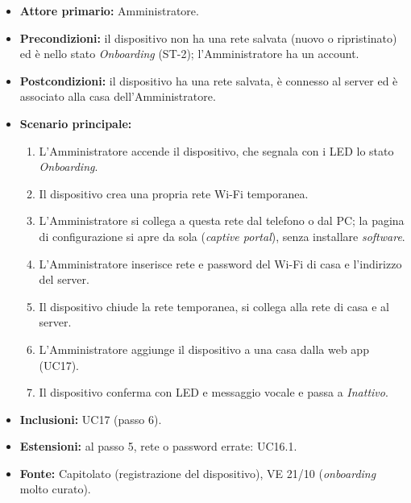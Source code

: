 \documentclass[12pt,a4paper]{article}
\newcommand{\tightlist}{\setlength{\itemsep}{1pt}\setlength{\parskip}{0pt}}
\begin{document}
\begin{itemize}

\tightlist

\item \textbf{Attore primario:} Amministratore.

\item \textbf{Precondizioni:} il dispositivo non ha una rete salvata (nuovo o ripristinato) ed è nello stato \emph{Onboarding} (ST-2); l'Amministratore ha un account.

\item \textbf{Postcondizioni:} il dispositivo ha una rete salvata, è connesso al server ed è associato alla casa dell'Amministratore.

\item \textbf{Scenario principale:}

\begin{enumerate}

\tightlist

\item L'Amministratore accende il dispositivo, che segnala con i LED lo stato \emph{Onboarding}.

\item Il dispositivo crea una propria rete Wi-Fi temporanea.

\item L'Amministratore si collega a questa rete dal telefono o dal PC; la pagina di configurazione si apre da sola (\emph{captive portal}), senza installare \emph{software}.

\item L'Amministratore inserisce rete e password del Wi-Fi di casa e l'indirizzo del server.

\item Il dispositivo chiude la rete temporanea, si collega alla rete di casa e al server.

\item L'Amministratore aggiunge il dispositivo a una casa dalla web app (UC17).

\item Il dispositivo conferma con LED e messaggio vocale e passa a \emph{Inattivo}.

\end{enumerate}

\item \textbf{Inclusioni:} UC17 (passo 6).

\item \textbf{Estensioni:} al passo 5, rete o password errate: UC16.1.

\item \textbf{Fonte:} Capitolato (registrazione del dispositivo), VE 21/10 (\emph{onboarding} molto curato).

\end{itemize}
\end{document}
